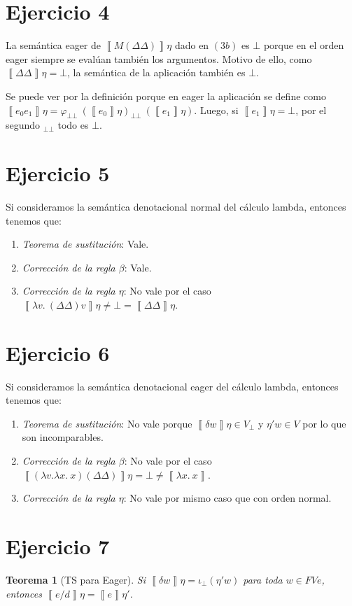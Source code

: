 \documentclass{article}
\newtheorem*{theorem*}{Teorema}
\newcommand{\sem}[1]{\left\llbracket #1\right\rrbracket}
\newcommand{\bbot}{\bot\!\!\!\bot}
\newcommand{\ibot}{\iota_\bot}
\begin{document}
\section*{Ejercicio 4}
La semántica eager de $\sem{M(\Delta\Delta)}\eta$ dado en $(3b)$ es $\bot$ porque en el orden eager siempre se evalúan también los argumentos.
Motivo de ello, como $\sem{\Delta\Delta}\eta = \bot$, la semántica de la aplicación también es $\bot$.

Se puede ver por la definición porque en eager la aplicación se define como $\sem{e_0e_1}\eta = \varphi_{\bbot}\ (\sem{e_0}\eta)_{\bbot}\ (\sem{e_1}\eta)$.
Luego, si $\sem{e_1}\eta = \bot$, por el segundo $_{\bbot}$ todo es $\bot$.

\section*{Ejercicio 5}
Si consideramos la semántica denotacional normal del cálculo lambda, entonces tenemos que:
\begin{enumerate}[label=(\alph*)]
  \item \textit{Teorema de sustitución}: Vale.
  \item \textit{Corrección de la regla $\beta$}: Vale.
  \item \textit{Corrección de la regla $\eta$}: No vale por el caso $\sem{\lambda v.\ (\Delta\Delta)v}\eta \neq \bot = \sem{\Delta\Delta}\eta$.
\end{enumerate}

\section*{Ejercicio 6}
Si consideramos la semántica denotacional eager del cálculo lambda, entonces tenemos que:
\begin{enumerate}[label=(\alph*)]
  \item \textit{Teorema de sustitución}: No vale porque $\sem{\delta w}\eta \in V_\bot$ y $\eta' w \in V$ por lo que son incomparables.
  \item \textit{Corrección de la regla $\beta$}: No vale por el caso $\sem{(\lambda v.\lambda x.\ x)(\Delta\Delta)}\eta = \bot \neq \sem{\lambda x.\ x}$.
  \item \textit{Corrección de la regla $\eta$}: No vale por mismo caso que con orden normal.
\end{enumerate}

\section*{Ejercicio 7}
\begin{theorem*}[TS para Eager]
  Si $\sem{\delta w}\eta = \ibot(\eta'w)$ para toda $w \in FVe$, entonces $\sem{e/d}\eta = \sem{e}\eta'$.
\end{theorem*}
\end{document}
